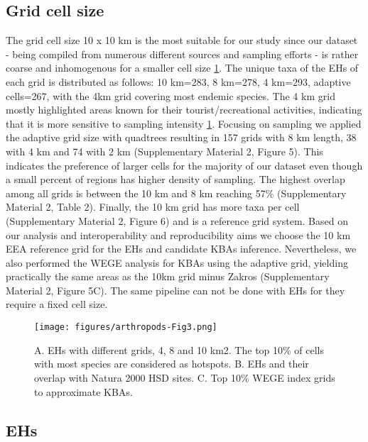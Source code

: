    \subsection{Grid cell size}
    \label{subsec:arthropods-grids}
The grid cell size 10 x 10 km is the most suitable for our study since our
dataset - being compiled from numerous different sources and sampling efforts -
is rather coarse and inhomogenous for a smaller cell size \ref{fig:arthropods-fig3}.
The unique taxa of the EHs of each grid is distributed as follows: 10 km=283,
8 km=278, 4 km=293, adaptive cells=267, with the 4km grid covering most endemic
species. The 4 km grid mostly highlighted areas known for their tourist/recreational activities,
indicating that it is more sensitive to sampling intensity \ref{fig:arthropods-fig3}.
Focusing on sampling we applied the adaptive grid size with quadtrees resulting
in 157 grids with 8 km length, 38 with 4 km and 74 with 2 km (Supplementary Material 2, Figure 5).
This indicates the preference of larger cells for the majority of our dataset
even though a small percent of regions has higher density of sampling.
The highest overlap among all grids is between the 10 km and 8 km reaching
57\% (Supplementary Material 2, Table 2). Finally, the 10 km grid has more taxa
per cell (Supplementary Material 2, Figure 6) and is a reference grid system.
Based on our analysis and interoperability and reproducibility aims we choose
the 10 km EEA reference grid for the EHs and candidate KBAs inference.
Nevertheless, we also performed the WEGE analysis for KBAs using the adaptive
grid, yielding practically the same areas as the 10km grid minus Zakros (Supplementary Material 2, Figure 5C).
The same pipeline can not be done with EHs for they require a fixed cell size.

   \begin{figure}[h]
      \centering
      \texttt{[image: figures/arthropods-Fig3.png]}
      \caption[Grids, hotspots and potential KBAs of Cretan endemic arthropods]{A. EHs with different grids, 4, 8 and 10 km2. The top 10\% of cells with most species are considered as hotspots. B. EHs and their overlap with Natura 2000 HSD sites. C. Top 10\% WEGE index grids to approximate KBAs.}
      \label{fig:arthropods-fig3}
   \end{figure}


    \subsection{EHs}
    \label{subsec:EHs}

